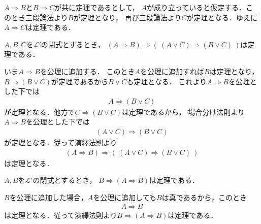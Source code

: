 	\begin{prf}
		$A \Longrightarrow B$と$B \Longrightarrow C$が共に定理であるとして，
		$A$が成り立っていると仮定する．このとき三段論法より$B$が定理となり，
		再び三段論法より$C$が定理となる．ゆえに$A \Longrightarrow C$は定理である．
		\QED
	\end{prf}
	
	\begin{screen}
		\begin{metathm}\label{metathm:rule_of_inference_1}
			$A,B,C$を$\mathcal{L}'$の閉式とするとき，
			$(A \Longrightarrow B) \Longrightarrow 
			(\ (A \vee C) \Longrightarrow (B \vee C)\ )$は定理である．
		\end{metathm}
	\end{screen}
	
	\begin{prf}
		いま$A \Longrightarrow B$を公理に追加する．
		このとき$A$を公理に追加すれば$B$は定理となり，
		$B \Longrightarrow (B \vee C)$が定理であるから$B \vee C$も定理となる．
		これより$A \Longrightarrow B$を公理とした下では
		\begin{align}
			A \Longrightarrow (B \vee C)
		\end{align}
		が定理となる．他方で$C \Longrightarrow (B \vee C)$は定理であるから，
		場合分け法則より$A \Longrightarrow B$を公理とした下では
		\begin{align}
			(A \vee C) \Longrightarrow (B \vee C)
		\end{align}
		が定理となる．従って演繹法則より
		\begin{align}
			(A \Longrightarrow B) \Longrightarrow 
			(\ (A \vee C) \Longrightarrow (B \vee C)\ )
		\end{align}
		は定理となる．
		\QED
	\end{prf}
	
	\begin{screen}
		\begin{metathm}\label{metathm:rule_of_inference_2}
			$A,B$を$\mathcal{L}'$の閉式とするとき，
			$B \Longrightarrow (A \Longrightarrow B)$は定理である．
		\end{metathm}
	\end{screen}
	
	\begin{prf}
		$B$を公理に追加した場合，$A$を公理に追加しても$B$は真であるから，このとき
		\begin{align}
			A \Longrightarrow B
		\end{align}
		は定理となる．従って演繹法則より$B \Longrightarrow (A \Longrightarrow B)$は定理である．
		\QED
	\end{prf}
	
